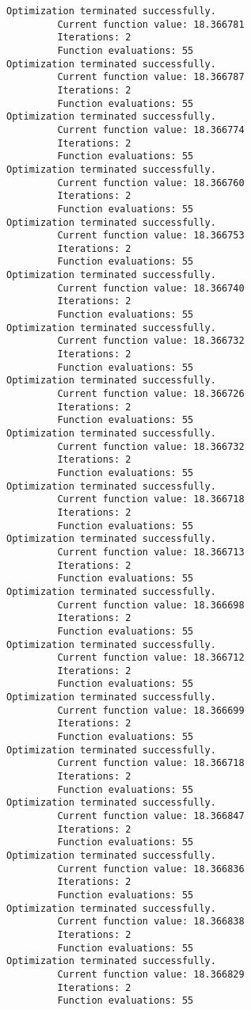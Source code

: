 \documentclass[11pt]{article}
\begin{document}
\begin{Verbatim}[commandchars=\\\{\}]
Optimization terminated successfully.
         Current function value: 18.366781
         Iterations: 2
         Function evaluations: 55
Optimization terminated successfully.
         Current function value: 18.366787
         Iterations: 2
         Function evaluations: 55
Optimization terminated successfully.
         Current function value: 18.366774
         Iterations: 2
         Function evaluations: 55
Optimization terminated successfully.
         Current function value: 18.366760
         Iterations: 2
         Function evaluations: 55
Optimization terminated successfully.
         Current function value: 18.366753
         Iterations: 2
         Function evaluations: 55
Optimization terminated successfully.
         Current function value: 18.366740
         Iterations: 2
         Function evaluations: 55
Optimization terminated successfully.
         Current function value: 18.366732
         Iterations: 2
         Function evaluations: 55
Optimization terminated successfully.
         Current function value: 18.366726
         Iterations: 2
         Function evaluations: 55
Optimization terminated successfully.
         Current function value: 18.366732
         Iterations: 2
         Function evaluations: 55
Optimization terminated successfully.
         Current function value: 18.366718
         Iterations: 2
         Function evaluations: 55
Optimization terminated successfully.
         Current function value: 18.366713
         Iterations: 2
         Function evaluations: 55
Optimization terminated successfully.
         Current function value: 18.366698
         Iterations: 2
         Function evaluations: 55
Optimization terminated successfully.
         Current function value: 18.366712
         Iterations: 2
         Function evaluations: 55
Optimization terminated successfully.
         Current function value: 18.366699
         Iterations: 2
         Function evaluations: 55
Optimization terminated successfully.
         Current function value: 18.366718
         Iterations: 2
         Function evaluations: 55
Optimization terminated successfully.
         Current function value: 18.366847
         Iterations: 2
         Function evaluations: 55
Optimization terminated successfully.
         Current function value: 18.366836
         Iterations: 2
         Function evaluations: 55
Optimization terminated successfully.
         Current function value: 18.366838
         Iterations: 2
         Function evaluations: 55
Optimization terminated successfully.
         Current function value: 18.366829
         Iterations: 2
         Function evaluations: 55

\end{Verbatim}
\end{document}
